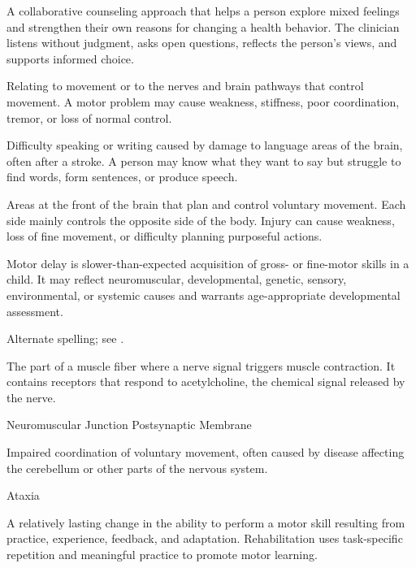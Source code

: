  A collaborative counseling approach that helps a person explore mixed feelings and strengthen their own reasons for changing a health behavior. The clinician listens without judgment, asks open questions, reflects the person’s views, and supports informed choice.

 Relating to movement or to the nerves and brain pathways that control movement. A motor problem may cause weakness, stiffness, poor coordination, tremor, or loss of normal control.

 Difficulty speaking or writing caused by damage to language areas of the brain, often after a stroke. A person may know what they want to say but struggle to find words, form sentences, or produce speech.

 Areas at the front of the brain that plan and control voluntary movement. Each side mainly controls the opposite side of the body. Injury can cause weakness, loss of fine movement, or difficulty planning purposeful actions.

 Motor delay is slower-than-expected acquisition of gross- or fine-motor skills in a child. It may reflect neuromuscular, developmental, genetic, sensory, environmental, or systemic causes and warrants age-appropriate developmental assessment.

 Alternate spelling; see .

 The part of a muscle fiber where a nerve signal triggers muscle contraction. It contains receptors that respond to acetylcholine, the chemical signal released by the nerve.

\synonyms
Neuromuscular Junction Postsynaptic Membrane

 Impaired coordination of voluntary movement, often caused by disease affecting the cerebellum or other parts of the nervous system.

\synonyms
Ataxia

 A relatively lasting change in the ability to perform a motor skill resulting from
practice, experience, feedback, and adaptation. Rehabilitation uses task-specific
repetition and meaningful practice to promote motor learning.

